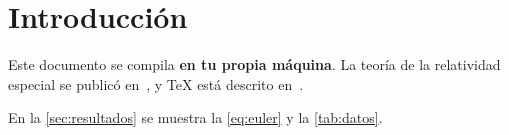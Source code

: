 \section{Introducción}\label{sec:intro}

Este documento se compila \textbf{en tu propia máquina}. La teoría de la relatividad
especial se publicó en~\cite{einstein1905}, y \TeX{} está descrito en~\cite{knuth1984,lamport1994}.

En la \cref{sec:resultados} se muestra la \cref{eq:euler} y la \cref{tab:datos}.
